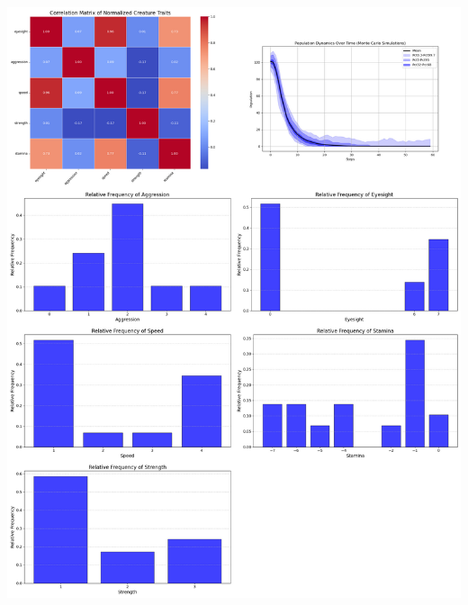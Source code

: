 \documentclass{article}
\begin{document}
\begin{center}
    \includegraphics[scale=0.21]{tests/2.2.jpg}
\end{center}
\end{document}
